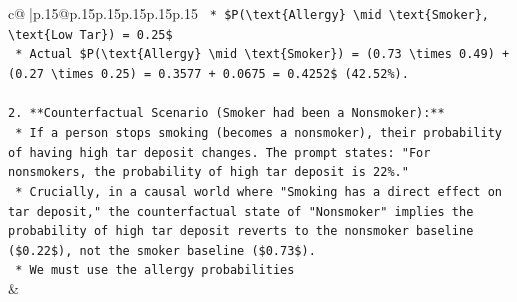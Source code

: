 \documentclass{article}
\begin{document}
{\begin{supertabular}{c@{$\;$}|p{.15\linewidth}@{}p{.15\linewidth}p{.15\linewidth}p{.15\linewidth}p{.15\linewidth}p{.15\linewidth}}
{{{\texttt{    *   \$P(\textbackslash{}text\{Allergy\} \textbackslash{}mid \textbackslash{}text\{Smoker\}, \textbackslash{}text\{Low Tar\}) = 0.25\$} \\
\texttt{    *   Actual \$P(\textbackslash{}text\{Allergy\} \textbackslash{}mid \textbackslash{}text\{Smoker\}) = (0.73 \textbackslash{}times 0.49) + (0.27 \textbackslash{}times 0.25) = 0.3577 + 0.0675 = 0.4252\$ (42.52\%).} \\
\\ 
\texttt{2.  **Counterfactual Scenario (Smoker had been a Nonsmoker):**} \\
\texttt{    *   If a person stops smoking (becomes a nonsmoker), their probability of having high tar deposit changes. The prompt states: "For nonsmokers, the probability of high tar deposit is 22\%."} \\
\texttt{    *   Crucially, in a causal world where "Smoking has a direct effect on tar deposit," the counterfactual state of "Nonsmoker" implies the probability of high tar deposit reverts to the nonsmoker baseline (\$0.22\$), not the smoker baseline (\$0.73\$).} \\
\texttt{    *   We must use the allergy probabilities} \\
            }
        }
    }
    & \\ \\


\end{supertabular}}
\end{document}
